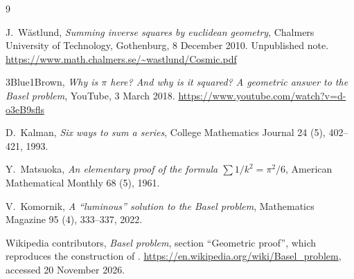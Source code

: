 \begin{thebibliography}{9}

J.~W\"astlund, \emph{Summing inverse squares by euclidean geometry},
Chalmers University of Technology, Gothenburg, 8 December 2010.
Unpublished note.
\url{https://www.math.chalmers.se/~wastlund/Cosmic.pdf}

3Blue1Brown, \emph{Why is $\pi$ here? And why is it squared? A geometric answer to the
Basel problem}, YouTube, 3 March 2018.
\url{https://www.youtube.com/watch?v=d-o3eB9sfls}

D.~Kalman, \emph{Six ways to sum a series}, College Mathematics Journal 24 (5), 402--421, 1993.

Y.~Matsuoka, \emph{An elementary proof of the formula $\sum 1/k^{2}=\pi^{2}/6$},
American Mathematical Monthly 68 (5), 1961.

V.~Komornik, \emph{A ``luminous'' solution to the Basel problem},
Mathematics Magazine 95 (4), 333--337, 2022.

{Wikipedia contributors}, \emph{Basel problem}, section ``Geometric proof'', which reproduces
the construction of \cite{wastlund}.
\url{https://en.wikipedia.org/wiki/Basel_problem}, accessed 20 November 2026.

\end{thebibliography}
